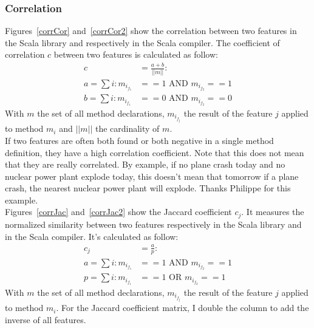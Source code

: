 \documentclass[12pt]{article}
\begin{document}
\subsubsection {Correlation}
\label{results:corr}
Figures~\ref{corrCor} and~\ref{corrCor2} show the correlation between two features in the Scala library and respectively in the Scala compiler. The coefficient of correlation $c$ between two features is calculated as follow:
\begin{align*}
c &= \frac{a+b}{||m||} :\\ a = \sum i : m_{i_{f_1}}&==1\mbox{ AND }m_{i_{f_2}}==1\\ b = \sum i : m_{i_{f_1}}&==0\mbox{ AND }m_{i_{f_2}}==0
\end{align*}
With $m$ the set of all method declarations, $m_{i_{f_j}}$ the result of the feature $j$ applied to method $m_i$ and $||m||$ the cardinality of $m$.\\
If two features are often both found or both negative in a single method definition, they have a high correlation coefficient. Note that this does not mean that they are really correlated. By example, if no plane crash today and no nuclear power plant explode today, this doesn't mean that tomorrow if a plane crash, the nearest nuclear power plant will explode. Thanks Philippe for this example.\\

Figures~\ref{corrJac} and~\ref{corrJac2} show the Jaccard coefficient $c_j$. It measures the normalized similarity between two features respectively in the Scala library and in the Scala compiler. It's calculated as follow: 
\begin{align*}
c_j &= \frac{a}{p}:\\ a = \sum i: m_{i_{f_1}}&== 1\mbox{ AND } m_{i_{f_2}}==1\\ p = \sum i : m_{i_{f_1}}&== 1\mbox{ OR }m_{i_{f_2}}==1
\end{align*}
With $m$ the set of all method declarations, $m_{i_{f_j}}$ the result of the feature $j$ applied to method $m_i$. For the Jaccard coefficient matrix, I double the column to add the inverse of all features.\\
\end{document}
